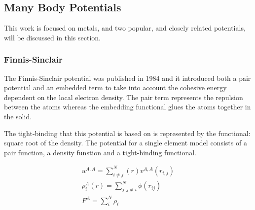 \FloatBarrier




\subsection{Many Body Potentials}

This work is focused on metals, and two popular, and closely related potentials, will be discussed in this section.

\subsubsection{Finnis-Sinclair}
\label{section:FinnisSinclair}

The Finnis-Sinclair potential was published in 1984\cite{finnissinclair} and it introduced both a pair potential and an embedded term to take into account the cohesive energy dependent on the local electron density.  The pair term represents the repulsion between the atoms whereas the embedding functional glues the atoms together in the solid.  

The tight-binding that this potential is based on is represented by the functional: square root of the density.  The potential for a single element model consists of a pair function, a density funstion and a tight-binding functional.

\begin{equation}
\begin{split}
u^{A,A} = \sum_{i \ne j}^{N}(r) v^{A,A}(r_{i,j}) \\
\rho^{A}_{i}(r) = \sum_{j, j \ne i}^{N} \phi(r_{ij}) \\
F^{A} = \sum_{i}^{N} \rho_i
\end{split}
\label{eq:eqFinnisSinclair}
\end{equation}


